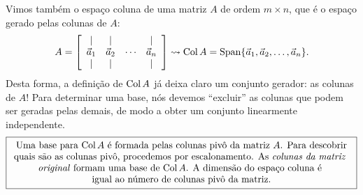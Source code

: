 \documentclass[../livro.tex]{subfiles}  %
\begin{document}
Vimos também o espaço coluna de uma matriz $A$ de ordem $m \times n$, que é o espaço gerado pelas colunas de $A$:
\[
A =
\left[
\begin{array}{cccc}
| & | &  & | \\
\vec{a}_1 & \vec{a}_2 & \cdots & \vec{a}_n \\
| & | &        & | \\
\end{array}
\right] \rightsquigarrow
\operatorname{Col} A = \operatorname{Span} \{ \vec{a}_1, \vec{a}_2, \dots, \vec{a}_n\}.
\] Desta forma, a definição de $\operatorname{Col} A$ já deixa claro um conjunto gerador: as colunas de $A$! Para determinar uma base, nós devemos ``excluir'' as colunas que podem ser geradas pelas demais, de modo a obter um conjunto linearmente independente.
\[
\boxed{
	\begin{array}{c}
	\text{Uma base para $\operatorname{Col} A$ é formada pelas colunas pivô da matriz $A$. Para descobrir} \\
	\text{quais são as colunas pivô, procedemos por escalonamento. As \textit{colunas da matriz} } \\
	\text{\textit{original} formam uma base de $\operatorname{Col} A$. A dimensão do espaço coluna é } \\
	\text{igual ao número de colunas pivô da matriz.}
	\end{array}
}
\]
\end{document}
